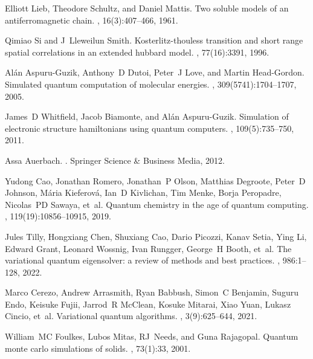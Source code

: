 \documentclass[showpacs,twocolumn,aps,prx,long bibliography,superscriptaddress,notitlepage]{revtex4-1}
\begin{document}
\begin{thebibliography}{10}

Elliott Lieb, Theodore Schultz, and Daniel Mattis.
\newblock Two soluble models of an antiferromagnetic chain.
, 16(3):407--466, 1961.

Qimiao Si and J~Lleweilun Smith.
\newblock Kosterlitz-thouless transition and short range spatial correlations
  in an extended hubbard model.
, 77(16):3391, 1996.

Al{\'a}n Aspuru-Guzik, Anthony~D Dutoi, Peter~J Love, and Martin Head-Gordon.
\newblock Simulated quantum computation of molecular energies.
, 309(5741):1704--1707, 2005.

James~D Whitfield, Jacob Biamonte, and Al{\'a}n Aspuru-Guzik.
\newblock Simulation of electronic structure hamiltonians using quantum
  computers.
, 109(5):735--750, 2011.

Assa Auerbach.
.
\newblock Springer Science \& Business Media, 2012.

Yudong Cao, Jonathan Romero, Jonathan~P Olson, Matthias Degroote, Peter~D
  Johnson, M{\'a}ria Kieferov{\'a}, Ian~D Kivlichan, Tim Menke, Borja
  Peropadre, Nicolas~PD Sawaya, et~al.
\newblock Quantum chemistry in the age of quantum computing.
, 119(19):10856--10915, 2019.

Jules Tilly, Hongxiang Chen, Shuxiang Cao, Dario Picozzi, Kanav Setia, Ying Li,
  Edward Grant, Leonard Wossnig, Ivan Rungger, George~H Booth, et~al.
\newblock The variational quantum eigensolver: a review of methods and best
  practices.
, 986:1--128, 2022.

Marco Cerezo, Andrew Arrasmith, Ryan Babbush, Simon~C Benjamin, Suguru Endo,
  Keisuke Fujii, Jarrod~R McClean, Kosuke Mitarai, Xiao Yuan, Lukasz Cincio,
  et~al.
\newblock Variational quantum algorithms.
, 3(9):625--644, 2021.

William~MC Foulkes, Lubos Mitas, RJ~Needs, and Guna Rajagopal.
\newblock Quantum monte carlo simulations of solids.
, 73(1):33, 2001.


\end{thebibliography}
\end{document}
